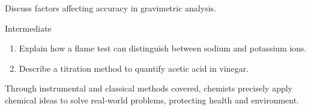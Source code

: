 \begin{stopandthink}
Discuss factors affecting accuracy in gravimetric analysis.
\end{stopandthink}

\FloatBarrier

\begin{tieredquestions}{Intermediate}
\begin{enumerate}
    \item Explain how a flame test can distinguish between sodium and potassium ions.
    \item Describe a titration method to quantify acetic acid in vinegar.
\end{enumerate}
\end{tieredquestions}

Through instrumental and classical methods covered, chemists precisely apply chemical ideas to solve real-world problems, protecting health and environment.

\FloatBarrier